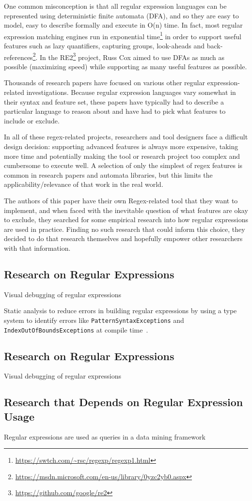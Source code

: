 One common misconception is that all regular expression languages can be represented using deterministic finite automata (DFA), and so they are easy to model, easy to describe formally and execute in O(n) time.  In fact, most regular expression matching engines run in exponential time\footnote{\url{https://swtch.com/~rsc/regexp/regexp1.html}} in order to support useful features such as lazy quantifiers, capturing groups, look-aheads and back-references\footnote{\url{https://msdn.microsoft.com/en-us/library/0yzc2yb0.aspx}}.  In the RE2\footnote{\url{https://github.com/google/re2}} project, Russ Cox aimed to use DFAs as much as possible (maximizing speed) while supporting as many useful features as possible.

Thousands of research papers have focused on various other regular expression-related investigations.  Because regular expression languages vary somewhat in their syntax and feature set, these papers have typically had to describe a particular language to reason about and have had to pick what features to include or exclude.

In all of these regex-related projects, researchers and tool designers face a difficult design decision: supporting advanced features is always more expensive, taking more time and potentially making the tool or research project too complex and cumbersome to execute well.  A selection of only the simplest of regex features is common in research papers and automata libraries, but this limits the applicability/relevance of that work in the real world.

The authors of this paper have their own Regex-related tool that they want to implement, and when faced with the inevitable question of what features are okay to exclude, they searched for some empirical research into how regular expressions are used in practice.  Finding no such research that could inform this choice, they decided to do that research themselves and hopefully empower other researchers with that information.




\subsection{Research on Regular Expressions}
Visual debugging of regular expressions~\cite{Beck:2014:RVD:2591062.2591111}

Static analysis to reduce errors in building regular expressions by using a type system to identify errors like {\tt PatternSyntaxExceptions} and {\tt IndexOutOfBoundsExceptions} at compile time~\cite{Spishak:2012:TSR:2318202.2318207}.

\subsection{Research on Regular Expressions}
Visual debugging of regular expressions~\cite{Beck:2014:RVD:2591062.2591111}

\subsection{Research that Depends on Regular Expression Usage}
Regular expressions are used as queries in a data mining framework~\cite{Begel:2010:CDE:1806799.1806821}

